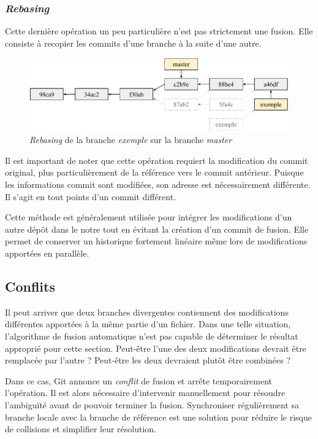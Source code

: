 \documentclass[11pt,a4paper]{article}
\begin{document}
\subsubsection{\textit{Rebasing}}

Cette dernière opération un peu particulière n'est pas strictement une fusion. Elle consiste à recopier les commits d'une branche à la suite d'une autre.

\begin{figure}[ht]
\begin{center}
\includegraphics[width=13cm]{img_rebase}
\caption{\textit{Rebasing} de la branche \textit{exemple} sur la branche \textit{master}}
\end{center}
\end{figure}

Il est important de noter que cette opération requiert la modification du commit original, plus particulièrement de la référence vers le commit antérieur.
Puisque les informations commit sont modifiées, son adresse est nécessairement différente. Il s'agit en tout points d'un commit différent.

Cette méthode est généralement utilisée pour intégrer les modifications d'un autre dépôt dans le notre tout en évitant la création d'un commit de fusion.
Elle permet de conserver un historique fortement linéaire même lors de modifications apportées en parallèle.

\subsection{Conflits}

Il peut arriver que deux branches divergentes contiennent des modifications différentes apportées à la même partie d'un fichier. Dans une telle situation, l'algorithme de fusion automatique n'est pas capable de déterminer le résultat approprié pour cette section.
Peut-être l'une des deux modifications devrait être remplacée par l'autre ?
Peut-être les deux devraient plutôt être combinées ?

Dans ce cas, Git annonce un \textit{conflit} de fusion et arrête temporairement l'opération.
Il est alors nécessaire d'intervenir manuellement pour résoudre l'ambiguïté avant de pouvoir terminer la fusion.
Synchroniser régulièrement sa branche locale avec la branche de référence est une solution pour réduire le risque de collisions et simplifier leur résolution.
\end{document}
